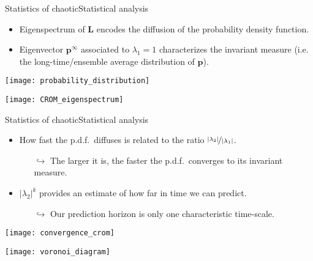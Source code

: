\begin{frame}[t, c]{Statistics of chaotic}{Statistical analysis}
  \begin{minipage}{.68\textwidth}
    \begin{itemize}
    \item Eigenspectrum of \( \bm{L} \) encodes the diffusion of the probability density function.
      
      \bigskip
      
    \item Eigenvector \( \bm{p}^{\infty} \) associated to \( \lambda_1 = 1 \) characterizes the invariant measure (i.e. the long-time/ensemble average distribution of \( \bm{p} \)).
    \end{itemize}
    
    \bigskip
    
    \centering
    \texttt{[image: probability\_distribution]}
  \end{minipage}%
  \hfill
  \begin{minipage}{.28\textwidth}
    \centering
    \texttt{[image: CROM\_eigenspectrum]}
  \end{minipage}
  
  \vspace{1cm}
\end{frame}

\begin{frame}[t, c]{Statistics of chaotic}{Statistical analysis}
  \begin{minipage}{.68\textwidth}
    \begin{itemize}
    \item How fast the p.d.f.\ diffuses is related to the ratio \( \nicefrac{\vert \lambda_2 \vert}{\vert \lambda_1 \vert} \).
      \begin{itemize}
      \item[\( \hookrightarrow	\)] The larger it is, the faster the p.d.f.\ converges to its invariant measure.
      \end{itemize}
      
      \medskip
      
    \item \( \vert \lambda_2 \vert^k \) provides an estimate of how far in time we can predict.
      \begin{itemize}
      \item[\( \hookrightarrow	\)] Our prediction horizon is only one characteristic time-scale.
      \end{itemize}
    \end{itemize}
    
    \medskip
    
    \centering
    \texttt{[image: convergence\_crom]}
  \end{minipage}%
  \hfill
  \begin{minipage}{.28\textwidth}
    \centering
    \texttt{[image: voronoi\_diagram]}
  \end{minipage}
  
  \vspace{1cm}
\end{frame}
